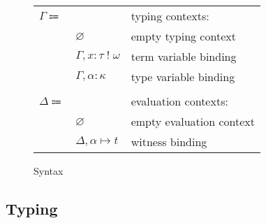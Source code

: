 \documentclass[12pt]{article}
\newcommand\kAnno[2]{#1 : #2}
\newcommand\tAnno[3]{#1 : \tEmbellished{#2}{#3}}
\newcommand\term{t}
\newcommand\eVar{x}
\newcommand\type{\tau}
\newcommand\tVar{\alpha}
\newcommand\row{\omega}
\newcommand\tEmbellished[2]{#1 \; ! \; #2}
\newcommand\kind{\kappa}
\newcommand\tContext{\Gamma}
\newcommand\tcEmpty{\varnothing}
\newcommand\tcEExtend[4]{#1, \tAnno{#2}{#3}{#4}}
\newcommand\tcTExtend[3]{#1, \kAnno{#2}{#3}}
\newcommand\eContext{\Delta}
\newcommand\ecEmpty{\varnothing}
\newcommand\ecExtend[3]{#1, #2 \mapsto #3}
\begin{document}
\begin{figure}[H]
\begin{mdframed}[backgroundcolor=none]
\begin{center}
\begin{tabular}{l l l}
              \\
              $\tContext \Coloneqq$ & & typing contexts: \\
              & $\tcEmpty$ & empty typing context \\
              & $\tcEExtend{\tContext}{\eVar}{\type}{\row}$ & term variable binding \\
              & $\tcTExtend{\tContext}{\tVar}{\kind}$ & type variable binding \\
              \\
              $\eContext \Coloneqq$ & & evaluation contexts: \\
              & $\ecEmpty$ & empty evaluation context \\
              & $\ecExtend{\eContext}{\tVar}{\term}$ & witness binding \\
            \end{tabular}
          \end{center}

          \caption{Syntax}\label{fig:syntax}
        \end{mdframed}
      \end{figure}

    \subsection{Typing}
\end{document}
